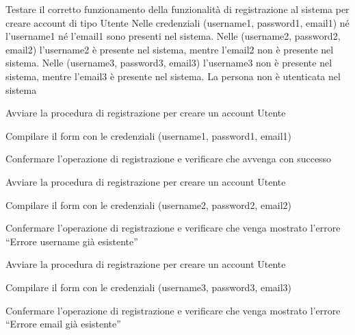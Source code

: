 {Testare il corretto funzionamento della funzionalità di registrazione al sistema per creare account di tipo Utente}
{Nelle credenziali (username1, password1, email1) né l'username1 né l'email1 sono presenti nel sistema. Nelle (username2, password2, email2) l'username2 è presente nel sistema, mentre l'email2 non è presente nel sistema. Nelle (username3, password3, email3) l'username3 non è presente nel sistema, mentre l'email3 è presente nel sistema. La persona non è utenticata nel sistema}
{\begin{enumCU}
	\item Avviare la procedura di registrazione per creare un account Utente
	\item Compilare il form con le credenziali (username1, password1, email1)
	\item Confermare l'operazione di registrazione e verificare che avvenga con successo
	\item Avviare la procedura di registrazione per creare un account Utente
	\item Compilare il form con le credenziali (username2, password2, email2)
	\item Confermare l'operazione di registrazione e verificare che venga mostrato l'errore ``Errore username già esistente''
	\item Avviare la procedura di registrazione per creare un account Utente
	\item Compilare il form con le credenziali (username3, password3, email3)
	\item Confermare l'operazione di registrazione e verificare che venga mostrato l'errore ``Errore email già esistente''
\end{enumCU}}


